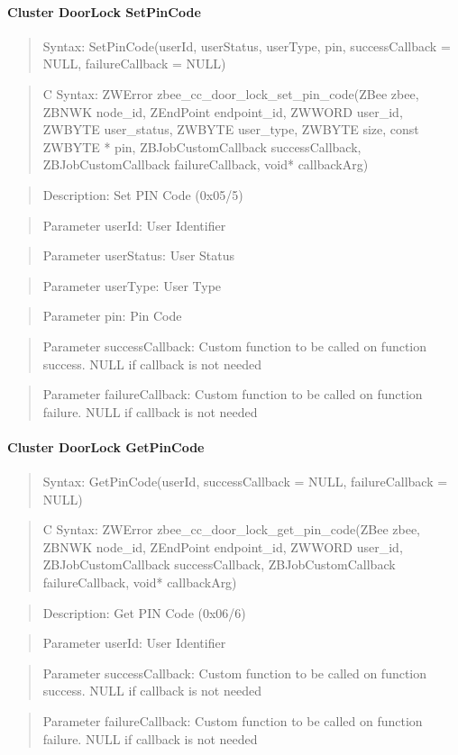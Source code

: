 \paragraph{Cluster DoorLock SetPinCode}
\begin{quote}Syntax: SetPinCode(userId, userStatus, userType, pin, successCallback = NULL, failureCallback = NULL)\end{quote}
\begin{quote}C Syntax: ZWError zbee\_cc\_door\_lock\_set\_pin\_code(ZBee zbee, ZBNWK node\_id, ZEndPoint endpoint\_id, ZWWORD user\_id, ZWBYTE user\_status, ZWBYTE user\_type, ZWBYTE size, const ZWBYTE * pin, ZBJobCustomCallback successCallback, ZBJobCustomCallback failureCallback, void* callbackArg)\end{quote}
\begin{quote}Description: Set PIN Code (0x05/5)\end{quote}
\begin{quote}Parameter userId: User Identifier\end{quote}
\begin{quote}Parameter userStatus: User Status\end{quote}
\begin{quote}Parameter userType: User Type\end{quote}
\begin{quote}Parameter pin: Pin Code\end{quote}
\begin{quote}Parameter successCallback: Custom function to be called on function success. NULL if callback is not needed\end{quote}
\begin{quote}Parameter failureCallback: Custom function to be called on function failure. NULL if callback is not needed\end{quote}


\paragraph{Cluster DoorLock GetPinCode}
\begin{quote}Syntax: GetPinCode(userId, successCallback = NULL, failureCallback = NULL)\end{quote}
\begin{quote}C Syntax: ZWError zbee\_cc\_door\_lock\_get\_pin\_code(ZBee zbee, ZBNWK node\_id, ZEndPoint endpoint\_id, ZWWORD user\_id, ZBJobCustomCallback successCallback, ZBJobCustomCallback failureCallback, void* callbackArg)\end{quote}
\begin{quote}Description: Get PIN Code (0x06/6)\end{quote}
\begin{quote}Parameter userId: User Identifier\end{quote}
\begin{quote}Parameter successCallback: Custom function to be called on function success. NULL if callback is not needed\end{quote}
\begin{quote}Parameter failureCallback: Custom function to be called on function failure. NULL if callback is not needed\end{quote}


